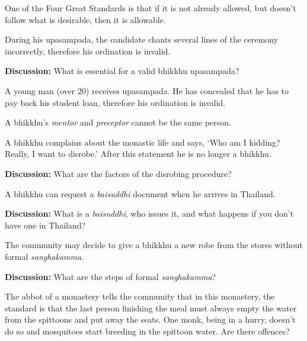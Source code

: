\begin{exam}{\autoExamName}
\begin{problem*}
\begin{parts}
  \item {} One of the Four Great Standards is that if it is not already allowed,
    but doesn't follow what is desirable, then it is allowable.

  \item {} During his upasampada, the candidate chants several lines of the
    ceremony incorrectly, therefore his ordination is invalid.

    \bigskip

    \textbf{Discussion:} What is essential for a valid bhikkhu upasampada?
    
  \item {} A young man (over 20) receives upasampada. He has concealed that
    he has to pay back his student loan, therefore his ordination is invalid.

  \item {} A bhikkhu's \emph{mentor} and \emph{preceptor} cannot be the same
    person.

  \item {} A bhikkhu complains about the monastic life and says, `Who am I kidding? Really,
    I want to disrobe.' After this statement he is no longer a bhikkhu.

    \bigskip

    \textbf{Discussion:} What are the factors of the disrobing procedure?

  \item {} A bhikkhu can request a \emph{baisuddhi} document when he arrives in Thailand.

    \bigskip

    \textbf{Discussion:} What is a \emph{baisuddhi}, who issues it, and what happens if you don't have one in Thailand?

  \item {} The community may decide to give a bhikkhu a new robe from the stores without formal \emph{sanghakamma}. 

    \bigskip

    \textbf{Discussion:} What are the steps of formal \emph{sanghakamma}?

  \end{parts}

\end{problem*}

\problemDivide

\begin{problem}

  The abbot of a monastery tells the community that in this monastery, the
  standard is that the last person finishing the meal must always empty the
  water from the spittoons and put away the seats. One monk, being in a hurry,
  doesn't do so and mosquitoes start breeding in the spittoon water. Are there
  offences?


\end{problem}
\end{exam}
